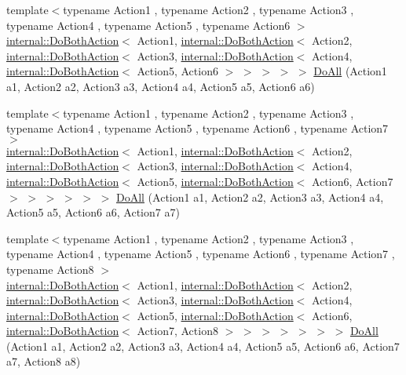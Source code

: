 \begin{DoxyCompactItemize}
\item 
{\footnotesize template$<$typename Action1 , typename Action2 , typename Action3 , typename Action4 , typename Action5 , typename Action6 $>$ }\\\hyperlink{classtesting_1_1internal_1_1DoBothAction}{internal\+::\+Do\+Both\+Action}$<$ Action1, \hyperlink{classtesting_1_1internal_1_1DoBothAction}{internal\+::\+Do\+Both\+Action}$<$ Action2, \hyperlink{classtesting_1_1internal_1_1DoBothAction}{internal\+::\+Do\+Both\+Action}$<$ Action3, \hyperlink{classtesting_1_1internal_1_1DoBothAction}{internal\+::\+Do\+Both\+Action}$<$ Action4, \hyperlink{classtesting_1_1internal_1_1DoBothAction}{internal\+::\+Do\+Both\+Action}$<$ Action5, Action6 $>$ $>$ $>$ $>$ $>$ \hyperlink{namespacetesting_aa6c87c8d7520fb333f1559487d3e06e9}{Do\+All} (Action1 a1, Action2 a2, Action3 a3, Action4 a4, Action5 a5, Action6 a6)
\item 
{\footnotesize template$<$typename Action1 , typename Action2 , typename Action3 , typename Action4 , typename Action5 , typename Action6 , typename Action7 $>$ }\\\hyperlink{classtesting_1_1internal_1_1DoBothAction}{internal\+::\+Do\+Both\+Action}$<$ Action1, \hyperlink{classtesting_1_1internal_1_1DoBothAction}{internal\+::\+Do\+Both\+Action}$<$ Action2, \hyperlink{classtesting_1_1internal_1_1DoBothAction}{internal\+::\+Do\+Both\+Action}$<$ Action3, \hyperlink{classtesting_1_1internal_1_1DoBothAction}{internal\+::\+Do\+Both\+Action}$<$ Action4, \hyperlink{classtesting_1_1internal_1_1DoBothAction}{internal\+::\+Do\+Both\+Action}$<$ Action5, \hyperlink{classtesting_1_1internal_1_1DoBothAction}{internal\+::\+Do\+Both\+Action}$<$ Action6, Action7 $>$ $>$ $>$ $>$ $>$ $>$ \hyperlink{namespacetesting_aadfaf4eb9897dcabe067b1d882febc86}{Do\+All} (Action1 a1, Action2 a2, Action3 a3, Action4 a4, Action5 a5, Action6 a6, Action7 a7)
\item 
{\footnotesize template$<$typename Action1 , typename Action2 , typename Action3 , typename Action4 , typename Action5 , typename Action6 , typename Action7 , typename Action8 $>$ }\\\hyperlink{classtesting_1_1internal_1_1DoBothAction}{internal\+::\+Do\+Both\+Action}$<$ Action1, \hyperlink{classtesting_1_1internal_1_1DoBothAction}{internal\+::\+Do\+Both\+Action}$<$ Action2, \hyperlink{classtesting_1_1internal_1_1DoBothAction}{internal\+::\+Do\+Both\+Action}$<$ Action3, \hyperlink{classtesting_1_1internal_1_1DoBothAction}{internal\+::\+Do\+Both\+Action}$<$ Action4, \hyperlink{classtesting_1_1internal_1_1DoBothAction}{internal\+::\+Do\+Both\+Action}$<$ Action5, \hyperlink{classtesting_1_1internal_1_1DoBothAction}{internal\+::\+Do\+Both\+Action}$<$ Action6, \hyperlink{classtesting_1_1internal_1_1DoBothAction}{internal\+::\+Do\+Both\+Action}$<$ Action7, Action8 $>$ $>$ $>$ $>$ $>$ $>$ $>$ \hyperlink{namespacetesting_a2c0e69056a8e5bc4ddc2308ba0af5214}{Do\+All} (Action1 a1, Action2 a2, Action3 a3, Action4 a4, Action5 a5, Action6 a6, Action7 a7, Action8 a8)

\end{DoxyCompactItemize}
